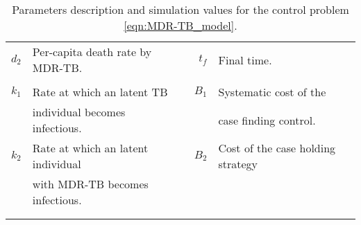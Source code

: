 \begin{table}[htb]
\begin{tabular}{rllrl}
          \\
      $d_2$ 
          & Per-capita  death rate by MDR-TB.
          &&
            $t_f$ 
              & Final time.
          \\
      \\
      $k_1$ 
        & Rate at which an latent TB 
        &&
          $B_1$ 
            &
              Systematic cost of the
        \\
        & individual becomes infectious. 
          &&&
            case finding  control.
      \\
          $k_2$  
          & Rate at which an latent individual
          &&
            $B_2$
            & 
            Cost of the case holding strategy
          \\
          & with MDR-TB becomes infectious.
    \\
    \\
%
%      
%      
%       
%            
%          
%         
         \\
    \bottomrule
    \end{tabular}
  \caption{Parameters description and simulation values for the control 
  problem \eqref{eqn:MDR-TB_model}.}
  \label{tbl:parameters_MDR-TB_model_des}
\end{table}

%
